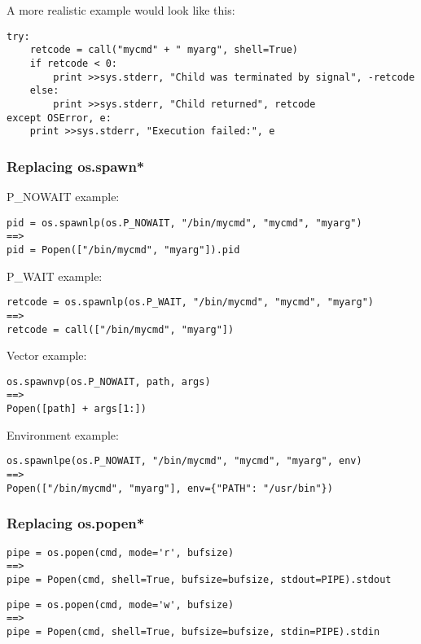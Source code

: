 A more realistic example would look like this:

\begin{verbatim}
try:
    retcode = call("mycmd" + " myarg", shell=True)
    if retcode < 0:
        print >>sys.stderr, "Child was terminated by signal", -retcode
    else:
        print >>sys.stderr, "Child returned", retcode
except OSError, e:
    print >>sys.stderr, "Execution failed:", e
\end{verbatim}

\subsubsection{Replacing os.spawn*}

P_NOWAIT example:

\begin{verbatim}
pid = os.spawnlp(os.P_NOWAIT, "/bin/mycmd", "mycmd", "myarg")
==>
pid = Popen(["/bin/mycmd", "myarg"]).pid
\end{verbatim}

P_WAIT example:

\begin{verbatim}
retcode = os.spawnlp(os.P_WAIT, "/bin/mycmd", "mycmd", "myarg")
==>
retcode = call(["/bin/mycmd", "myarg"])
\end{verbatim}

Vector example:

\begin{verbatim}
os.spawnvp(os.P_NOWAIT, path, args)
==>
Popen([path] + args[1:])
\end{verbatim}

Environment example:

\begin{verbatim}
os.spawnlpe(os.P_NOWAIT, "/bin/mycmd", "mycmd", "myarg", env)
==>
Popen(["/bin/mycmd", "myarg"], env={"PATH": "/usr/bin"})
\end{verbatim}

\subsubsection{Replacing os.popen*}

\begin{verbatim}
pipe = os.popen(cmd, mode='r', bufsize)
==>
pipe = Popen(cmd, shell=True, bufsize=bufsize, stdout=PIPE).stdout
\end{verbatim}

\begin{verbatim}
pipe = os.popen(cmd, mode='w', bufsize)
==>
pipe = Popen(cmd, shell=True, bufsize=bufsize, stdin=PIPE).stdin
\end{verbatim}

